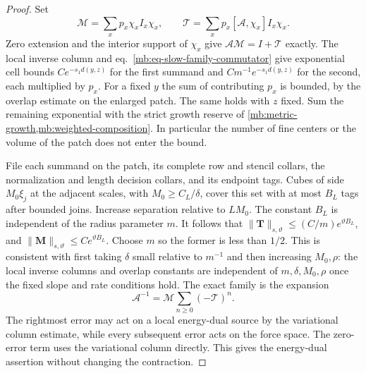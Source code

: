 \documentclass[11pt,letterpaper,reqno]{amsart}
\numberwithin{equation}{section}
\renewcommand{\eqref}[1]{\textup{eq.~\ref{#1}}}
\theoremstyle{definition}
\theoremstyle{remark}
\begin{document}
\begin{proof}
Set
\[
 \mathcal M=\sum_xp_x\chi_x I_x\chi_x,\qquad
 \mathcal T=\sum_xp_x[\mathcal A,\chi_x] I_x\chi_x .
\]
Zero extension and the interior support of \(\chi_x\) give
\(\mathcal A\mathcal M=I+\mathcal T\) exactly. The local inverse column and \eqref{mb:eq-slow-family-commutator} give exponential cell bounds \(Ce^{-s_1d(y,z)}\) for the first summand and \(Cm^{-1}e^{-s_1d(y,z)}\) for the second, each multiplied by \(p_x\). For a fixed \(y\) the sum of contributing \(p_x\) is bounded, by the overlap estimate on the enlarged patch. The same holds with \(z\) fixed. Sum the remaining exponential with the strict growth reserve of \cref{mb:metric-growth,mb:weighted-composition}. In particular the number of fine centers or the volume of the patch does not enter the bound.

File each summand on the patch, its complete row and stencil collars, the normalization and length decision collars, and its endpoint tags. Cubes of side \(M_0\xi_j\) at the adjacent scales, with \(M_0\ge C_L/\delta\), cover this set with at most \(B_L\) tags after bounded joins. Increase separation relative to \(LM_0\). The constant \(B_L\) is independent of the radius parameter \(m\). It follows that \(\|\mathbf T\|_{s,\vartheta}\le(C/m)e^{\vartheta B_L}\), and \(\|\mathbf M\|_{s,\vartheta}\le Ce^{\vartheta B_L}\). Choose \(m\) so the former is less than \(1/2\). This is consistent with first taking \(\delta\) small relative to \(m^{-1}\) and then increasing \(M_0,\rho\): the local inverse columns and overlap constants are independent of \(m,\delta,M_0,\rho\) once the fixed slope and rate conditions hold. The exact family is the expansion
\begin{equation}\label{mb:eq-positive-walk}
                    \mathcal A^{-1}=\mathcal M\sum_{n\ge0}(-\mathcal T)^n .
\end{equation}
The rightmost error may act on a local energy-dual source by the variational column estimate, while every subsequent error acts on the force space. The zero-error term uses the variational column directly. This gives the energy-dual assertion without changing the contraction.


\end{proof}
\end{document}

